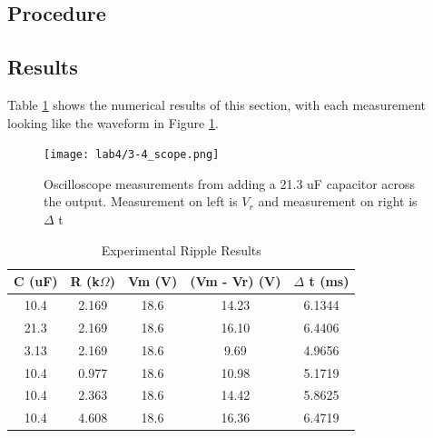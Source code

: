 \documentclass[12pt,letterpaper]{report}
\begin{document}
\subsection*{Procedure}


\subsection*{Results}
Table \ref{table:ripple_results} shows the numerical results of this section, with each measurement looking like the waveform in Figure \ref{fig:3-4_scope}. 
\begin{figure}[H]
\centering
\texttt{[image: lab4/3-4\_scope.png]}
\caption{Oscilloscope measurements from adding a 21.3 uF capacitor across the output. Measurement on left is $V_r$ and measurement on right is $\Delta$ t}
\label{fig:3-4_scope}
\end{figure}

\begin{table}[ht]
\caption{Experimental Ripple Results} %
\centering 
    \begin{tabular}{| c | c | c | c | c |}
    \hline  
    C (uF) & R (k$\Omega$) & Vm (V) & (Vm - Vr) (V) & $\Delta$ t (ms)\\
    \hline
    10.4 & 2.169 & 18.6 & 14.23 & 6.1344 \\
    21.3 & 2.169 & 18.6 & 16.10 & 6.4406 \\
    3.13 & 2.169 & 18.6 &  9.69 & 4.9656 \\
    10.4 & 0.977 & 18.6 & 10.98 & 5.1719 \\
    10.4 & 2.363 & 18.6 & 14.42 & 5.8625 \\
    10.4 & 4.608 & 18.6 & 16.36 & 6.4719 \\
    \hline
    \end{tabular}
    \label{table:ripple_results}
\end{table}

\end{document}
